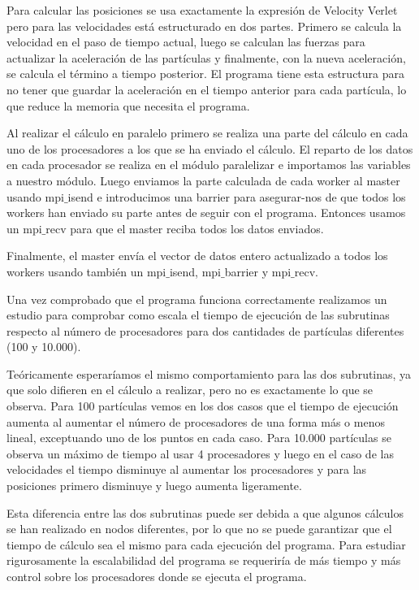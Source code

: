 \documentclass[onecolumn]{article}
\begin{document}
Para calcular las posiciones se usa exactamente la expresión de Velocity Verlet pero para las velocidades está estructurado en dos partes. Primero se calcula la velocidad en el paso de tiempo actual, luego se calculan las fuerzas para actualizar la aceleración de las partículas y finalmente, con la nueva aceleración, se calcula el término a tiempo posterior. El programa tiene esta estructura para no tener que guardar la aceleración en el tiempo anterior para cada partícula, lo que reduce la memoria que necesita el programa.

Al realizar el cálculo en paralelo primero se realiza una parte del cálculo en cada uno de los procesadores a los que se ha enviado el cálculo. El reparto de los datos en cada procesador se realiza en el módulo paralelizar e importamos las variables a nuestro módulo.
Luego enviamos la parte calculada de cada worker al master usando mpi$\_$isend e introducimos una barrier para asegurar-nos de que todos los workers han enviado su parte antes de seguir con el programa. Entonces usamos un mpi$\_$recv para que el master reciba todos los datos enviados.

Finalmente, el master envía el vector de datos entero actualizado a todos los workers usando también un mpi$\_$isend, mpi$\_$barrier y mpi$\_$recv.

Una vez comprobado que el programa funciona correctamente realizamos un estudio para comprobar como escala el tiempo de ejecución de las subrutinas respecto al número de procesadores para dos cantidades de partículas diferentes (100 y 10.000).

Teóricamente esperaríamos el mismo comportamiento para las dos subrutinas, ya que solo difieren en el cálculo a realizar, pero no es exactamente lo que se observa. Para 100 partículas vemos en los dos casos que el tiempo de ejecución aumenta al aumentar el número de procesadores de una forma más o menos lineal, exceptuando uno de los puntos en cada caso. Para 10.000 partículas se observa un máximo de tiempo al usar 4 procesadores y luego en el caso de las velocidades el tiempo disminuye al aumentar los procesadores y para las posiciones primero disminuye y luego aumenta ligeramente.



Esta diferencia entre las dos subrutinas puede ser debida a que algunos cálculos se han realizado en nodos diferentes, por lo que no se puede garantizar que el tiempo de cálculo sea el mismo para cada ejecución del programa. Para estudiar rigurosamente la escalabilidad del programa se requeriría de más tiempo y más control sobre los procesadores donde se ejecuta el programa.
\end{document}
